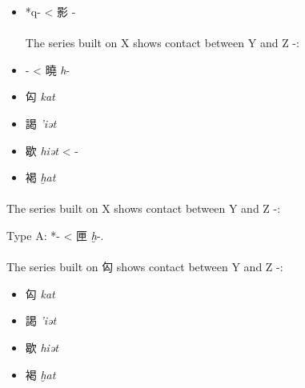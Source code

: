 \begin{itemize}
    \item *q- < 影 
    {}- 

\vspace{2mm}

\paragraph{}
The series built on X 
shows contact between Y and Z -:


    \item {}- < 曉  \emph{h}-
\end{itemize}



\begin{itemize}\item
{\Large{匃}}  \emph{kat} %

\item
{\Large{謁}}  \emph{'iət} %

\item
{\Large{歇}}  \emph{hiət} \textless{} {}- %

\item
{\Large{褐}} \emph{ḫat} %
\end{itemize}

\paragraph{}
The series built on X 
shows contact between Y and Z -:

Type A: *{}- < 匣 \emph{ḫ}-.

\paragraph{}
The series built on 匃 
shows contact between Y and Z -:


\begin{itemize}\item
{\Large{匃}}  \emph{kat} %

\item
{\Large{謁}}  \emph{'iət} %

\item
{\Large{歇}}  \emph{hiət} %

\item
{\Large{褐}} \emph{ḫat} %
\end{itemize}

